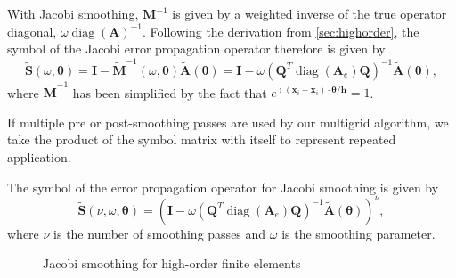 \documentclass[review]{siamart190516}
\DeclareMathOperator{\diag}{diag}
\begin{document}
With Jacobi smoothing, $\mathbf{M}^{-1}$ is given by a weighted inverse of the true operator diagonal, $\omega \diag \left( \mathbf{A} \right)^{-1}$.
Following the derivation from \cref{sec:highorder}, the symbol of the Jacobi error propagation operator therefore is given by
\begin{equation}
\tilde{\mathbf{S}} \left( \omega, \boldsymbol{\theta} \right) = \mathbf{I} - \tilde{\mathbf{M}}^{-1} \left( \omega, \boldsymbol{\theta} \right) \tilde{\mathbf{A}} \left( \boldsymbol{\theta} \right) = \mathbf{I} - \omega \left( \mathbf{Q}^T \diag \left( \mathbf{A}_e \right) \mathbf{Q} \right)^{-1} \tilde{\mathbf{A}} \left( \boldsymbol{\theta} \right),
\end{equation}
where $\tilde{\mathbf{M}}^{-1}$ has been simplified by the fact that $e^{\imath \left( \mathbf{x}_i - \mathbf{x}_i \right) \cdot \boldsymbol{\theta} / \mathbf{h}} = 1$.

If multiple pre or post-smoothing passes are used by our multigrid algorithm, we take the product of the symbol matrix with itself to represent repeated application.

\begin{definition}\label{def:jacobi_symbol}
The symbol of the error propagation operator for Jacobi smoothing is given by
\begin{equation}
\tilde{\mathbf{S}} \left( \nu, \omega, \boldsymbol{\theta} \right) = \left( \mathbf{I} - \omega \left( \mathbf{Q}^T \diag \left( \mathbf{A}_e \right) \mathbf{Q} \right)^{-1} \tilde{\mathbf{A}} \left( \boldsymbol{\theta} \right) \right)^\nu,
\end{equation}
where $\nu$ is the number of smoothing passes and $\omega$ is the smoothing parameter.
\end{definition}

\begin{figure}[!tbp]
  \centering
  \hfill
  \caption{Jacobi smoothing for high-order finite elements}
\end{figure}
\end{document}
